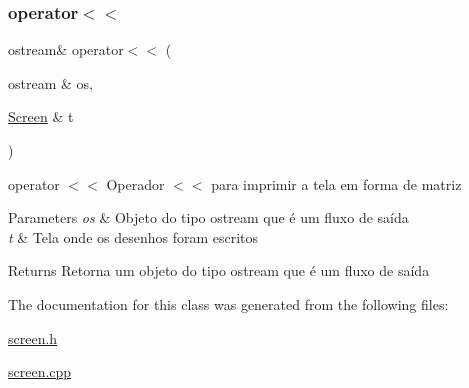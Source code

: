\subsubsection{\texorpdfstring{operator$<$$<$}{operator<<}}
{\footnotesize\ttfamily ostream\& operator$<$$<$ (\begin{DoxyParamCaption}\item[{ostream \&}]{os,  }\item[{\mbox{\hyperlink{class_screen}{Screen}} \&}]{t }\end{DoxyParamCaption})\hspace{0.3cm}{\ttfamily [friend]}}



operator $<$$<$ Operador $<$$<$ para imprimir a tela em forma de matriz 


\begin{DoxyParams}{Parameters}
{\em os} & Objeto do tipo ostream que é um fluxo de saída \\
\hline
{\em t} & Tela onde os desenhos foram escritos \\
\hline
\end{DoxyParams}
\begin{DoxyReturn}{Returns}
Retorna um objeto do tipo ostream que é um fluxo de saída 
\end{DoxyReturn}


The documentation for this class was generated from the following files\+:\begin{DoxyCompactItemize}
\item 
\mbox{\hyperlink{screen_8h}{screen.\+h}}\item 
\mbox{\hyperlink{screen_8cpp}{screen.\+cpp}}\end{DoxyCompactItemize}
